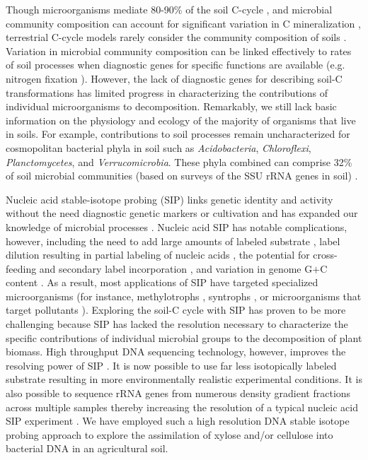 Though microorganisms mediate 80-90\% of the soil C-cycle
\citep{ColemanCrossley_1996,Nannipieri_2003}, and microbial community
composition can account for significant variation in C mineralization
\citep{Strickland_2009}, terrestrial C-cycle models rarely consider the
community composition of soils \citep{Zak2006,Reed2007}. Variation in microbial
community composition can be linked effectively to rates of soil processes when
diagnostic genes for specific functions are available (e.g. nitrogen fixation
\citep{Hsu2009}).  However, the lack of diagnostic genes for describing soil-C
transformations has limited progress in characterizing the contributions of
individual microorganisms to decomposition. Remarkably, we still lack basic
information on the physiology and ecology of the majority of organisms that
live in soils. For example, contributions to soil processes remain
uncharacterized for cosmopolitan bacterial phyla in soil such as
\textit{Acidobacteria}, \textit{Chloroflexi}, \textit{Planctomycetes}, and
\textit{Verrucomicrobia}. These phyla combined can comprise 32\% of soil
microbial communities (based on surveys of the SSU rRNA genes in soil)
\citep{Janssen2006,Buckley2002}. 

Nucleic acid stable-isotope probing (SIP) links genetic identity and activity
without the need diagnostic genetic markers or cultivation and has expanded our
knowledge of microbial processes
\citep{Chen_Murrell_2010}. Nucleic acid SIP has notable complications, however,
including the need to add large amounts of labeled substrate
\citep{radajewski2000stable}, label dilution resulting in partial labeling of
nucleic acids \citep{radajewski2000stable}, the potential for cross-feeding and
secondary label incorporation \citep{DeRito2005}, and variation in genome G$+$C
content \citep{Buckley_2007}.  As a result, most applications of SIP have
targeted specialized microorganisms (for instance, methylotrophs
\citep{lueders2004b}, syntrophs \citep{lueders2004}, or microorganisms that
target pollutants \citep{derito2005}). Exploring the soil-C cycle with SIP has
proven to be more challenging because SIP has lacked the resolution necessary
to characterize the specific contributions of individual microbial groups to
the decomposition of plant biomass. High throughput DNA sequencing technology,
however, improves the resolving power of SIP \citep{Aoyagi2015}. It is now
possible to use far less isotopically labeled substrate resulting in more
environmentally realistic experimental conditions. It is also possible to
sequence rRNA genes from numerous density gradient fractions across multiple
samples thereby increasing the resolution of a typical nucleic acid SIP
experiment \citep{Verastegui_2014}.  We have employed such a high resolution
DNA stable isotope probing approach to explore the assimilation of xylose
and/or cellulose into bacterial DNA in an agricultural soil. 

